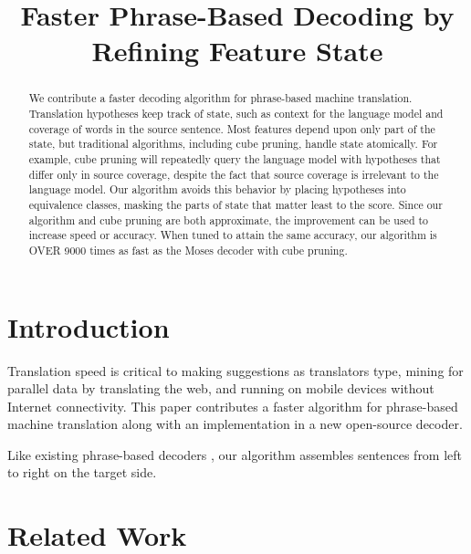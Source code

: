 \documentclass[11pt]{article}
\title{Faster Phrase-Based Decoding by Refining Feature State}
\author{}
\date{}
\begin{document}
\maketitle
\begin{abstract}
We contribute a faster decoding algorithm for phrase-based machine translation.  Translation hypotheses keep track of state, such as context for the language model and coverage of words in the source sentence.  Most features depend upon only part of the state, but traditional algorithms, including cube pruning, handle state atomically.  For example, cube pruning will repeatedly query the language model with hypotheses that differ only in source coverage, despite the fact that source coverage is irrelevant to the language model.  
Our algorithm avoids this behavior by placing hypotheses into equivalence classes, masking the parts of state that matter least to the score.  
Since our algorithm and cube pruning are both approximate, the improvement can be used to increase speed or accuracy.  
When tuned to attain the same accuracy, our algorithm is OVER 9000 times as fast as the Moses decoder with cube pruning.  
\end{abstract}

\section{Introduction}
Translation speed is critical to making suggestions as translators type, mining for parallel data by translating the web, and running on mobile devices without Internet connectivity.  This paper contributes a faster algorithm for phrase-based machine translation along with an implementation in a new open-source decoder.  

Like existing phrase-based decoders \cite{moses,jane-phrase,phrasal}, our algorithm assembles sentences from left to right on the target side.  



\section{Related Work}




\end{document}
